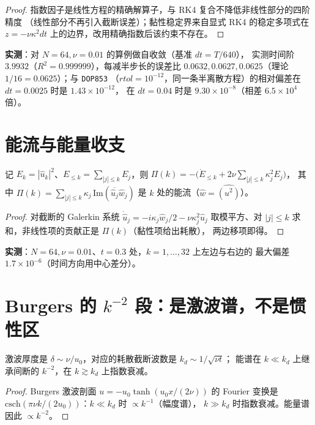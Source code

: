 \begin{proof}
指数因子是线性方程的精确解算子，与 RK4 复合不降低非线性部分的四阶精度
（线性部分不再引入截断误差）；黏性稳定界来自显式 RK4 的稳定多项式在
$z=-\nu\kappa^2dt$ 上的边界，改用精确指数后该约束不存在。
\end{proof}

\textbf{实测}：对 $N=64,\nu=0.01$ 的算例做自收敛（基准 $dt=T/640$），
实测时间阶 $3.9932$（$R^2=0.999999$），每减半步长的误差比
$0.0632,0.0627,0.0625$（理论 $1/16=0.0625$）；与 \texttt{DOP853}
（$rtol=10^{-12}$，同一条半离散方程）的相对偏差在 $dt=0.0025$ 时是 $1.43\times10^{-12}$，
在 $dt=0.04$ 时是 $9.30\times10^{-8}$（相差 $6.5\times10^{4}$ 倍）。

\section{能流与能量收支}

\begin{theorem}[逐带能量恒等式]
记 $E_k=|\hat u_k|^2$、$E_{\le k}=\sum_{|j|\le k}E_j$，则
$\Pi(k)=-\big(\dot E_{\le k}+2\nu\sum_{|j|\le k}\kappa_j^2E_j\big)$，
其中 $\Pi(k)=\sum_{|j|\le k}\kappa_j\,\mathrm{Im}(\overline{\hat u_j}\hat w_j)$
是 $k$ 处的能流（$\hat w=\widehat{(u^2)}$）。
\end{theorem}

\begin{proof}
对截断的 Galerkin 系统 $\dot{\hat u}_j=-i\kappa_j\hat w_j/2-\nu\kappa_j^2\hat u_j$
取模平方、对 $|j|\le k$ 求和，非线性项的贡献正是 $\Pi(k)$（黏性项给出耗散），
两边移项即得。
\end{proof}

\textbf{实测}：$N=64,\nu=0.01$、$t=0.3$ 处，$k=1,\dots,32$ 上左边与右边的
最大偏差 $1.7\times10^{-6}$（时间方向用中心差分）。

\section{Burgers 的 $k^{-2}$ 段：是激波谱，不是惯性区}

\begin{theorem}[黏性截断波数]
激波厚度是 $\delta\sim\nu/u_0$，对应的耗散截断波数是 $k_d\sim1/\sqrt{\nu t}$；
能谱在 $k\ll k_d$ 上继承间断的 $k^{-2}$，在 $k\gtrsim k_d$ 上指数衰减。
\end{theorem}

\begin{proof}
Burgers 激波剖面 $u=-u_0\tanh(u_0x/(2\nu))$ 的 Fourier 变换是
$\mathrm{csch}(\pi\nu k/(2u_0))$：$k\ll k_d$ 时 $\propto k^{-1}$（幅度谱），
$k\gg k_d$ 时指数衰减。能量谱因此 $\propto k^{-2}$。
\end{proof}

